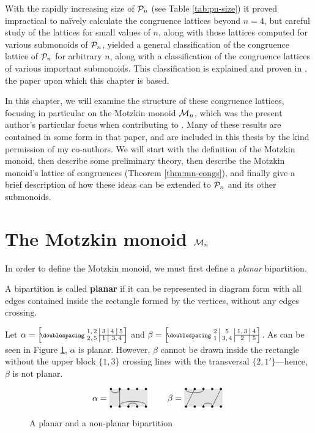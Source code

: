 With the rapidly increasing size of $\mathcal{P}_n$ (see Table
\ref{tab:pn-size}) it proved impractical to na\"ively calculate the congruence
lattices beyond $n=4$, but careful study of the lattices for small values of
$n$, along with those lattices computed for various submonoids of $\mathcal{P}_n$,
yielded a general classification of the congruence lattice of $\mathcal{P}_n$ for
arbitrary $n$, along with a classification of the congruence lattices of various
important submonoids.  This classification is explained and proven in
\cite{ourpaper}, the paper upon which this chapter is based.

In this chapter, we will examine the structure of these congruence lattices,
focusing in particular on the Motzkin monoid $\mathcal{M}_n$, which was the present
author's particular focus when contributing to \cite{ourpaper}.  Many of these
results are contained in some form in that paper, and are included in this
thesis by the kind permission of my co-authors.  We will start with the
definition of the Motzkin monoid, then describe some preliminary theory, then
describe the Motzkin monoid's lattice of congruences (Theorem
\ref{thm:mn-congs}), and finally give a brief description of how these ideas can
be extended to $\mathcal{P}_n$ and its other submonoids.

\section{The Motzkin monoid $\mathcal{M}_n$}
\label{sec:motzkin-monoid}
In order to define the Motzkin monoid, we must first define a \textit{planar}
bipartition.

\begin{definition}
  \label{def:planar}
  A bipartition is called \textbf{planar} if it can be represented in diagram
  form with all edges contained inside the rectangle formed by the vertices,
  without any edges crossing.
\end{definition}

\begin{example}
  Let $\alpha = \bipart{c|c|c|c}{2-4}{1,2 &3 &4 &5}{2,5 &1 &\mc2{c}{3,4}}$ and
  $\beta = \bipart{c|c|c|c}{3-4}{2 &5 &1,3 &4}{1 &3,4 &2 &5}$.  As can be seen
  in Figure \ref{fig:planar}, $\alpha$ is planar.  However, $\beta$ cannot be
  drawn inside the rectangle without the upper block $\{1,3\}$ crossing lines
  with the transversal $\{2, 1'\}$---hence, $\beta$ is not planar.
\end{example}

\begin{figure}[h]
  \centering
  $$\alpha = \bipartdiag{\tc12\tv22\bC25 \bc34} \qquad
  \beta = \bipartdiag{\tc13 \tv21 \tv54\bc34}$$
  \caption{A planar and a non-planar bipartition}
  \label{fig:planar}
\end{figure}

